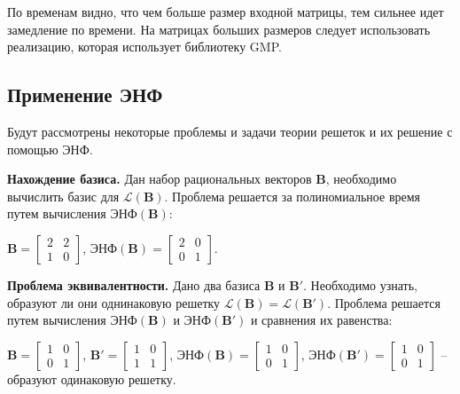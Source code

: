 По временам видно, что чем больше размер входной матрицы, тем сильнее идет замедление по времени. На матрицах больших размеров следует использовать реализацию, которая использует библиотеку GMP.

\subsection{Применение ЭНФ}

Будут рассмотрены некоторые проблемы и задачи теории решеток и их решение с помощью ЭНФ.

\textbf{Нахождение базиса.} Дан набор рациональных векторов $ \mathbf{B} $, необходимо вычислить базис для $ \mathcal{L}(\mathbf{B}) $. Проблема решается за полиномиальное время путем вычисления $ \text{ЭНФ}(\mathbf{B}) $: 

$ \mathbf{B} = \left[\begin{array}{cccc}
2 & 2 \\
1 & 0
\end{array}\right] $, 
$ \text{ЭНФ}(\mathbf{B}) = \left[\begin{array}{cccc}
2 & 0 \\
0 & 1
\end{array}\right] $.

\textbf{Проблема эквивалентности.} Дано два базиса $ \mathbf{B} $ и $ \mathbf{B}' $. Необходимо узнать, образуют ли они однинаковую решетку $ \mathcal{L}(\mathbf{B}) = \mathcal{L}(\mathbf{B}') $. Проблема решается путем вычисления $ \text{ЭНФ}(\mathbf{B}) $ и $ \text{ЭНФ}(\mathbf{B}') $ и сравнения их равенства:

$ \mathbf{B} = \left[\begin{array}{cccc}
1 & 0 \\
0 & 1
\end{array}\right] $, 
$ \mathbf{B}' = \left[\begin{array}{cccc}
1 & 0 \\
1 & 1
\end{array}\right] $, 
$ \text{ЭНФ}(\mathbf{B}) = \left[\begin{array}{cccc}
1 & 0 \\
0 & 1
\end{array}\right] $,
$ \text{ЭНФ}(\mathbf{B}') = \left[\begin{array}{cccc}
1 & 0 \\
0 & 1
\end{array}\right] $ -- образуют одинаковую решетку.

